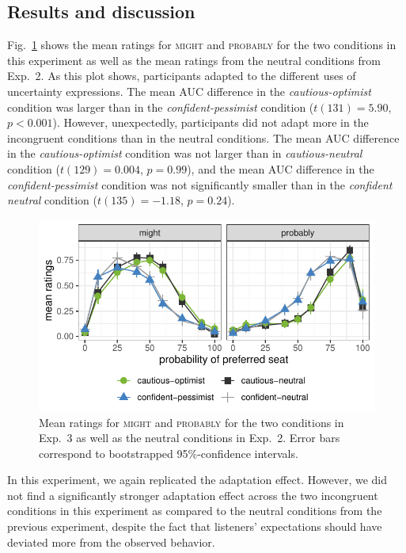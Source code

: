 \documentclass[man,floatsintext]{apa6}
\begin{document}
\subsection{Results and discussion}

Fig.~\ref{fig:results-exp3} shows the mean ratings for \textsc{might} and \textsc{probably} for the two conditions in this experiment as well as the mean ratings from the neutral conditions from Exp.~2. As this plot shows, participants adapted to the different uses of uncertainty expressions. The mean AUC difference in the \textit{cautious-optimist} condition was larger than in the \textit{confident-pessimist} condition ($t(131)=5.90$, $p<0.001$). However, unexpectedly, participants did not adapt more in the incongruent conditions than in the neutral conditions. The mean AUC difference in the \textit{cautious-optimist} condition was not larger than in \textit{cautious-neutral} condition ($t(129)=0.004$, $p=0.99$), and the mean AUC difference in the \textit{confident-pessimist} condition was not significantly smaller than in the \textit{confident neutral} condition ($t(135)=-1.18$, $p=0.24$).

\begin{figure}[t]
    \centering
    \includegraphics[width=\columnwidth]{incongruent.pdf}
    \caption{Mean ratings for \textsc{might} and \textsc{probably} for the two conditions in Exp.~3 as well as the neutral conditions in Exp.~2. Error bars correspond to bootstrapped 95\%-confidence intervals.}
    \label{fig:results-exp3}
\end{figure}

In this experiment, we again replicated the adaptation effect. However, we did not find a significantly stronger adaptation effect across the two incongruent conditions in this experiment as compared to the neutral conditions from the previous experiment, despite the fact that listeners' expectations should have deviated more from the observed behavior.
\end{document}
